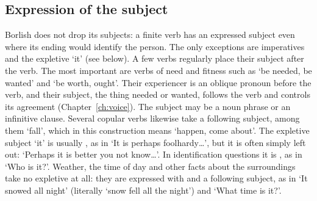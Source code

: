 \subsection{Expression of the subject}
Borlish does not drop its subjects: a finite verb has an expressed subject even where its ending would identify the person. The only exceptions are imperatives and the expletive `it' (see below).
A few verbs regularly place their subject after the verb. The most important are verbs of need and fitness such as  `be needed, be wanted' and  `be worth, ought'. Their experiencer is an oblique pronoun before the verb, and their subject, the thing needed or wanted, follows the verb and controls its agreement (Chapter~\ref{ch:voice}). The subject may be a noun phrase or an infinitive clause.
Several copular verbs likewise take a following subject, among them  `fall', which in this construction means `happen, come about'.
The expletive subject `it' is usually , as in  `It is perhaps foolhardy\ldots', but it is often simply left out:  `Perhaps it is better you not know\ldots'. In identification questions it is , as in  `Who is it?'. Weather, the time of day and other facts about the surroundings take no expletive at all: they are expressed with  and a following subject, as in  `It snowed all night' (literally `snow fell all the night') and  `What time is it?'.

